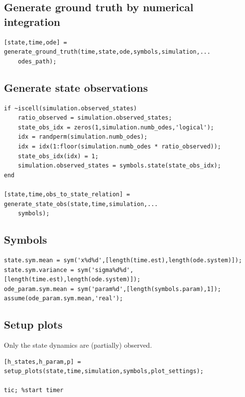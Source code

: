 \begin{par}
\subsection{ Generate ground truth by numerical integration }
\end{par} \vspace{1em}
\color{RoyalPurple}\begin{verbatim}
[state,time,ode] = generate_ground_truth(time,state,ode,symbols,simulation,...
    odes_path);
\end{verbatim}
\color{black}
\begin{par}
\subsection{ Generate state observations }
\end{par} \vspace{1em}
\color{RoyalPurple}\begin{verbatim}
if ~iscell(simulation.observed_states)
    ratio_observed = simulation.observed_states;
    state_obs_idx = zeros(1,simulation.numb_odes,'logical');
    idx = randperm(simulation.numb_odes);
    idx = idx(1:floor(simulation.numb_odes * ratio_observed));
    state_obs_idx(idx) = 1;
    simulation.observed_states = symbols.state(state_obs_idx);
end

[state,time,obs_to_state_relation] = generate_state_obs(state,time,simulation,...
    symbols);
\end{verbatim}
\color{black}
\begin{par}
\subsection{ Symbols }
\end{par} \vspace{1em}
\color{RoyalPurple}\begin{verbatim}
state.sym.mean = sym('x%d%d',[length(time.est),length(ode.system)]);
state.sym.variance = sym('sigma%d%d',[length(time.est),length(ode.system)]);
ode_param.sym.mean = sym('param%d',[length(symbols.param),1]);
assume(ode_param.sym.mean,'real');
\end{verbatim}
\color{black}
\begin{par}
\subsection{ Setup plots }
\end{par} \vspace{1em}
\begin{par}
Only the state dynamics are (partially) observed.
\end{par} \vspace{1em}
\color{RoyalPurple}\begin{verbatim}
[h_states,h_param,p] = setup_plots(state,time,simulation,symbols,plot_settings);

tic; %start timer
\end{verbatim}
\color{black}


